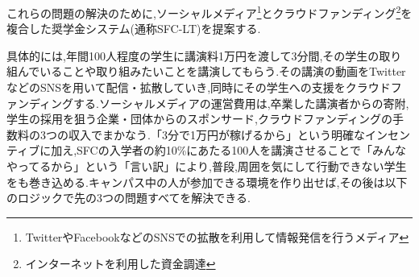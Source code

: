 \documentclass[uplatex, a4j]{jsarticle}
\begin{document}
これらの問題の解決のために,ソーシャルメディア\footnote{TwitterやFacebookなどのSNSでの拡散を利用して情報発信を行うメディア}とクラウドファンディング\footnote{インターネットを利用した資金調達}を複合した奨学金システム(通称SFC-LT)を提案する.

具体的には,年間100人程度の学生に講演料1万円を渡して3分間,その学生の取り組んでいることや取り組みたいことを講演してもらう.その講演の動画をTwitterなどのSNSを用いて配信・拡散していき,同時にその学生への支援をクラウドファンディングする.ソーシャルメディアの運営費用は,卒業した講演者からの寄附,学生の採用を狙う企業・団体からのスポンサード,クラウドファンディングの手数料の3つの収入でまかなう.「3分で1万円が稼げるから」という明確なインセンティブに加え,SFCの入学者の約10\%にあたる100人を講演させることで「みんなやってるから」という「言い訳」により,普段,周囲を気にして行動できない学生をも巻き込める.キャンパス中の人が参加できる環境を作り出せば,その後は以下のロジックで先の3つの問題すべてを解決できる.
\end{document}
